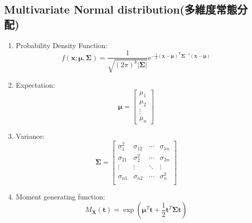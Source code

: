 \documentclass[12pt, a4paper]{article}
\begin{document}
\subsection{Multivariate Normal distribution(多維度常態分配)}
\begin{enumerate}
\item Probability Density Function:$$f(\mathbf{x}; \boldsymbol{\mu}, \boldsymbol{\Sigma}){={\frac {1}{\sqrt {(2\pi )^{k}|{\boldsymbol {\Sigma }}|}}}\mathrm {e} ^{-{\frac {1}{2}}({\mathbf {x} }-{\boldsymbol {\mu }})^{\mathrm {T} }{\boldsymbol {\Sigma }}^{-1}({\mathbf {x} }-{\boldsymbol {\mu }})}}$$
\item Expectation:$$\boldsymbol{\mu} = \begin{bmatrix} \mu_1 \\ \mu_2 \\ \vdots \\ \mu_n \end{bmatrix}
$$
\item Variance:$$\boldsymbol{\Sigma} = \begin{bmatrix}
\sigma_1^2 & \sigma_{12} & \cdots & \sigma_{1n} \\
\sigma_{21} & \sigma_2^2 & \cdots & \sigma_{2n} \\
\vdots & \vdots & \ddots & \vdots \\
\sigma_{n1} & \sigma_{n2} & \cdots & \sigma_n^2 \\
\end{bmatrix}$$
\item Moment generating function:$$M_{\mathbf{X}}(\mathbf{t}) = \exp\left(\boldsymbol{\mu}^T \mathbf{t} + \frac{1}{2} \mathbf{t}^T \boldsymbol{\Sigma} \mathbf{t}\right)$$
\end{enumerate}
\end{document}
